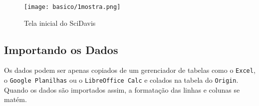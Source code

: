 \begin{figure}[H]
    \centering
    \texttt{[image: basico/1mostra.png]}

    \caption{Tela inicial do SciDavis}
    \label{fig:basico:mostragem}
\end{figure}








\subsection{Importando os Dados}

    Os dados podem ser apenas copiados de um gerenciador de tabelas como o \texttt{Excel}, o \texttt{Google Planilhas} ou o \texttt{LibreOffice Calc} e colados na tabela do \texttt{Origin}. Quando os dados são importados assim, a formatação das linhas e colunas se matém.

